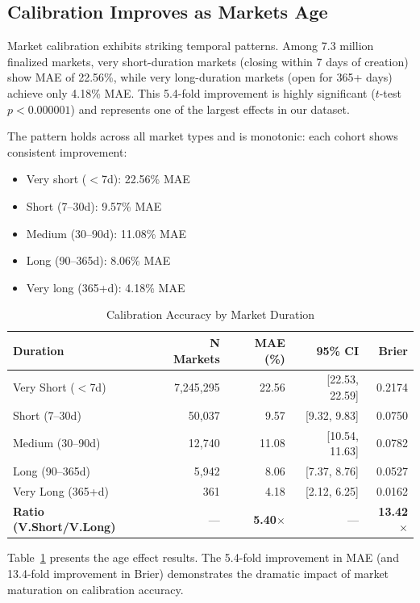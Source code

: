 \documentclass[12pt,letterpaper]{article}
\begin{document}
\subsection{Calibration Improves as Markets Age}

Market calibration exhibits striking temporal patterns. Among 7.3 million finalized markets, very short-duration markets (closing within 7 days of creation) show MAE of 22.56\%, while very long-duration markets (open for 365+ days) achieve only 4.18\% MAE. This 5.4-fold improvement is highly significant ($t$-test $p < 0.000001$) and represents one of the largest effects in our dataset.

The pattern holds across all market types and is monotonic: each cohort shows consistent improvement:
\begin{itemize}
    \item Very short ($<$7d): 22.56\% MAE
    \item Short (7--30d): 9.57\% MAE
    \item Medium (30--90d): 11.08\% MAE
    \item Long (90--365d): 8.06\% MAE
    \item Very long (365+d): 4.18\% MAE
\end{itemize}

\begin{table}[ht]
\centering
\caption{Calibration Accuracy by Market Duration}
\label{tab:age-effects}
\begin{tabular}{lrrrr}
\toprule
\textbf{Duration} & \textbf{N Markets} & \textbf{MAE (\%)} & \textbf{95\% CI} & \textbf{Brier} \\
\midrule
Very Short ($<$7d) & 7,245,295 & 22.56 & [22.53, 22.59] & 0.2174 \\
Short (7--30d) & 50,037 & 9.57 & [9.32, 9.83] & 0.0750 \\
Medium (30--90d) & 12,740 & 11.08 & [10.54, 11.63] & 0.0782 \\
Long (90--365d) & 5,942 & 8.06 & [7.37, 8.76] & 0.0527 \\
Very Long (365+d) & 361 & 4.18 & [2.12, 6.25] & 0.0162 \\
\midrule
\textbf{Ratio (V.Short/V.Long)} & --- & \textbf{5.40$\times$} & --- & \textbf{13.42$\times$} \\
\bottomrule
\end{tabular}
\end{table}

Table~\ref{tab:age-effects} presents the age effect results. The 5.4-fold improvement in MAE (and 13.4-fold improvement in Brier) demonstrates the dramatic impact of market maturation on calibration accuracy.
\end{document}
